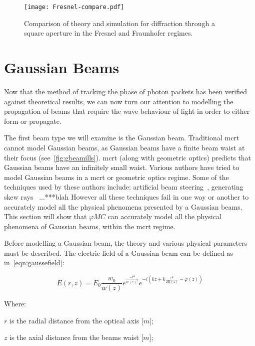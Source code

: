 \begin{figure}[!ht]
    \centering
    \texttt{[image: Fresnel-compare.pdf]}
    \caption{Comparison of theory and simulation for diffraction through a square aperture in the Fresnel and Fraunhofer regimes.}
    \label{fig:frescompare}
\end{figure}

\FloatBarrier

\section{Gaussian Beams}

Now that the method of tracking the phase of photon packets has been verified against theoretical results, we can now turn our attention to modelling the propagation of beams that require the wave behaviour of light in order to either form or propagate.

The first beam type we will examine is the Gaussian beam.
Traditional \gls*{mcrt} cannot model Gaussian beams, as Gaussian beams have a finite beam waist at their focus (see~\cref{fig:gbeamills}).
\Gls*{mcrt} (along with geometric optics) predicts that Gaussian beams have an infinitely small waist.
Various authors have tried to model Gaussian beams in a \gls*{mcrt} or geometric optics regime.
Some of the techniques used by these authors include: artificial beam steering~\cite{hokr2015modeling}, generating skew rays~\cite{arnaud1985representation} ...***blah
However all these techniques fail in one way or another to accurately model all the physical phenomena presented by a Gaussian beams.
This section will show that $\varphi MC$ can accurately model all the physical phenomena of Gaussian beams, within the \gls*{mcrt} regime.

Before modelling a Gaussian beam, the theory and various physical parameters must be described. 
The electric field of a Gaussian beam can be defined as in~\cref{eqn:gaussefield}:

\begin{equation}
E(r,z)=E_0\frac{w_0}{w(z)}e^{\frac{-r^2}{w(z)^2}}e^{-i(kz+k\frac{r^2}{2R(z)}-\varphi(z))}
\label{eqn:gaussefield}
\end{equation}

\noindent Where:

    \indent $r$ is the radial distance from the optical axis [$m$];

    \indent $z$ is the axial distance from  the beams waist [$m$];

